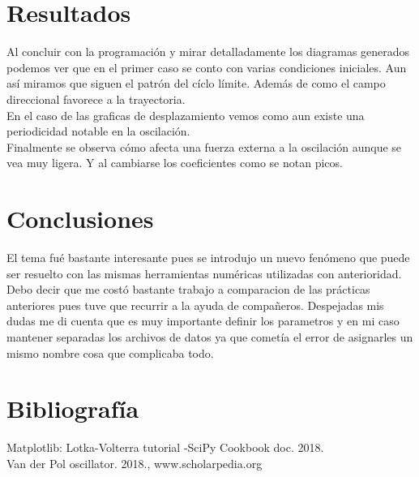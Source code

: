 \documentclass{article}
\begin{document}
\section{Resultados}
Al concluir con la programación y mirar detalladamente los diagramas generados podemos ver que en el primer caso se conto con varias condiciones iniciales. Aun así miramos que siguen el patrón del cíclo límite. Además de como el campo direccional favorece a la trayectoria.\\
En el caso de las graficas de desplazamiento vemos como aun existe una periodicidad notable en la oscilación.\\
Finalmente se observa cómo afecta una fuerza externa a la oscilación aunque se vea muy ligera. Y al cambiarse los coeficientes como se notan picos.\\
\section{Conclusiones}
El tema fué bastante interesante pues se introdujo un nuevo fenómeno que puede ser resuelto con las mismas herramientas numéricas utilizadas con anterioridad. Debo decir que me costó bastante trabajo a comparacion de las prácticas anteriores pues tuve que recurrir a la ayuda de compañeros. Despejadas mis dudas me di cuenta que es muy importante definir los parametros y en mi caso mantener separadas los archivos de datos ya que cometía el error de asignarles un mismo nombre cosa que complicaba todo.\\
\section{Bibliografía}
Matplotlib: Lotka-Volterra tutorial -SciPy Cookbook doc. 2018.\\
Van der Pol oscillator. 2018., www.scholarpedia.org\\
\end{document}
